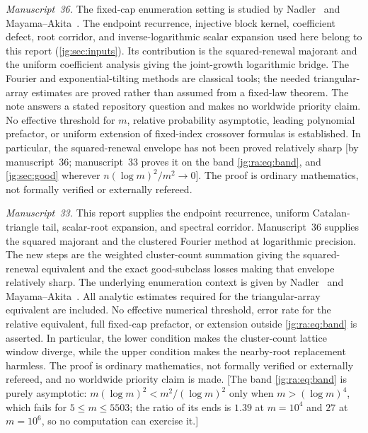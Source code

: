 \documentclass[11pt,a4paper]{article}
\theoremstyle{definition}\newaliascnt{definition}{theorem}
\theoremstyle{remark}\newaliascnt{remark}{theorem}
\begin{document}
\emph{Manuscript~36.} The fixed-cap enumeration setting is studied by
Nadler~\cite{Nadler} and Mayama--Akita~\cite{MayamaAkita}. The endpoint
recurrence, injective block kernel, coefficient defect, root corridor, and
inverse-logarithmic scalar expansion used here belong to this report
(\cref{jg:sec:inputs}). Its contribution is the squared-renewal majorant and the
uniform coefficient analysis giving the joint-growth logarithmic bridge. The
Fourier and exponential-tilting methods are classical tools; the needed
triangular-array estimates are proved rather than assumed from a fixed-law
theorem. The note answers a stated repository question and makes no worldwide
priority claim. No effective threshold for $m$, relative probability asymptotic,
leading polynomial prefactor, or uniform extension of fixed-index crossover
formulas is established. In particular, the squared-renewal envelope has not
been proved relatively sharp [by manuscript~36; manuscript~33 proves it on the
band \eqref{jg:ra:eq:band}, and \cref{jg:sec:good} wherever
$n(\log m)^2/m^2\to0$]. The proof is ordinary mathematics, not formally
verified or externally refereed.

\emph{Manuscript~33.} This report supplies the endpoint recurrence, uniform
Catalan-triangle tail, scalar-root expansion, and spectral corridor.
Manuscript~36 supplies the squared majorant and the clustered Fourier method at
logarithmic precision. The new steps are the weighted cluster-count summation
giving the squared-renewal equivalent and the exact good-subclass losses making
that envelope relatively sharp. The underlying enumeration context is given by
Nadler~\cite{Nadler} and Mayama--Akita~\cite{MayamaAkita}. All analytic
estimates required for the triangular-array equivalent are included. No
effective numerical threshold, error rate for the relative equivalent, full
fixed-cap prefactor, or extension outside \eqref{jg:ra:eq:band} is asserted. In
particular, the lower condition makes the cluster-count lattice window diverge,
while the upper condition makes the nearby-root replacement harmless. The proof
is ordinary mathematics, not formally verified or externally refereed, and no
worldwide priority claim is made. [The band \eqref{jg:ra:eq:band} is purely
asymptotic: $m(\log m)^2<m^2/(\log m)^2$ only when $m>(\log m)^4$, which fails
for $5\le m\le5503$; the ratio of its ends is $1.39$ at $m=10^4$ and $27$ at
$m=10^6$, so no computation can exercise it.]
\end{document}
